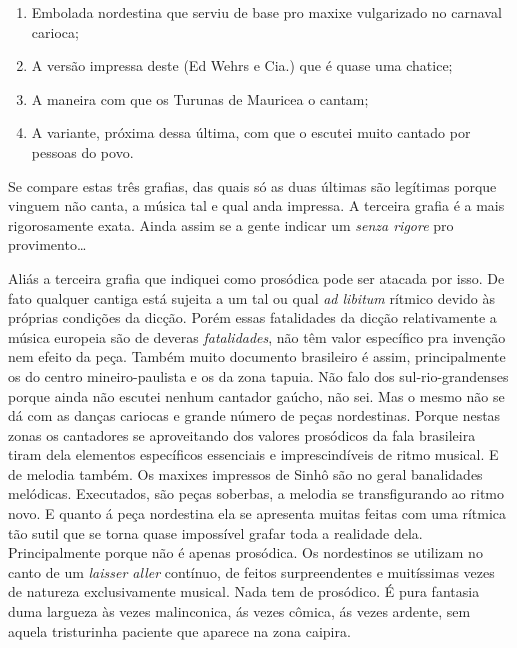\begin{enumerate}
\item  Embolada nordestina que serviu de base pro maxixe vulgarizado no carnaval carioca; 
\item  A versão impressa deste (Ed Wehrs e Cia.) que é quase uma chatice; 
\item  A maneira com que os Turunas de Mauricea o cantam;
\item  A variante, próxima dessa última, com que o escutei muito cantado por pessoas do povo. 
\end{enumerate}

Se compare estas três grafias, das quais só as duas
últimas são legítimas porque vinguem não canta, a música tal e qual anda
impressa. A terceira grafia é a mais rigorosamente exata. Ainda assim se
a gente indicar um \textit{senza rigore} pro provimento\ldots{}



Aliás a terceira grafia que indiquei como prosódica pode ser atacada por
isso. De fato qualquer cantiga está sujeita a um tal ou qual \emph{ad
libitum} rítmico devido às próprias condições da dicção. Porém essas
fatalidades da dicção relativamente a música europeia são de deveras
\emph{fatalidades}, não têm valor específico pra invenção nem efeito da
peça. Também muito documento brasileiro é assim, principalmente os do
centro mineiro-paulista e os da zona tapuia. Não falo dos
sul-rio-grandenses porque ainda não escutei nenhum cantador gaúcho, não
sei. Mas o mesmo não se dá com as danças cariocas e grande número de
peças nordestinas. Porque nestas zonas os cantadores se aproveitando dos
valores prosódicos da fala brasileira tiram dela elementos específicos
essenciais e imprescindíveis de ritmo musical. E de melodia também. Os
maxixes impressos de Sinhô são no geral banalidades melódicas.
Executados, são peças soberbas, a melodia se transfigurando ao ritmo
novo. E quanto á peça nordestina ela se apresenta muitas feitas com uma
rítmica tão sutil que se torna quase impossível grafar toda a realidade
dela. Principalmente porque não é apenas prosódica. Os nordestinos se
utilizam no canto de um \emph{laisser aller} contínuo, de feitos
surpreendentes e muitíssimas vezes de natureza exclusivamente musical.
Nada tem de prosódico. É pura fantasia duma largueza às vezes
malinconica, ás vezes cômica, ás vezes ardente, sem aquela tristurinha
paciente que aparece na zona caipira.

